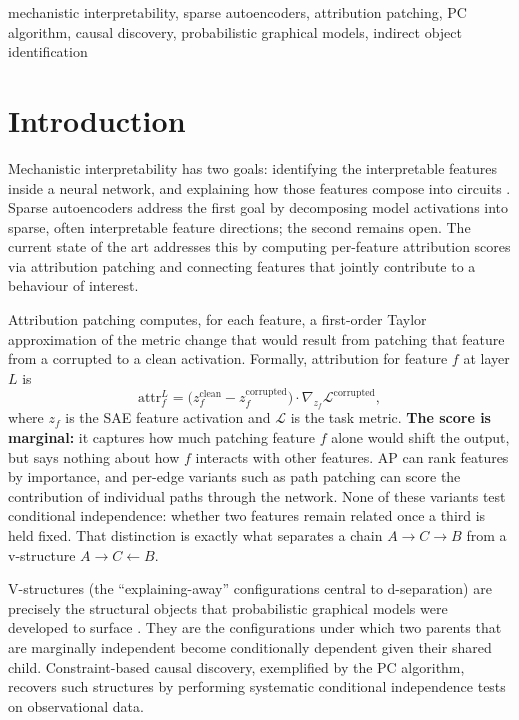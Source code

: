\documentclass[conference]{IEEEtran}
\begin{document}
\begin{IEEEkeywords}
mechanistic interpretability, sparse autoencoders, attribution patching, PC algorithm, causal discovery, probabilistic graphical models, indirect object identification
\end{IEEEkeywords}

\section{Introduction}\label{sec:intro}
Mechanistic interpretability has two goals: identifying the interpretable features inside a neural network, and explaining how those features compose into circuits \cite{marks2025}. Sparse autoencoders \cite{bricken2023, lieberum2024} address the first goal by decomposing model activations into sparse, often interpretable feature directions; the second remains open. The current state of the art \cite{marks2025} addresses this by computing per-feature attribution scores via attribution patching \cite{nanda2022, syed2023} and connecting features that jointly contribute to a behaviour of interest.

Attribution patching computes, for each feature, a first-order Taylor approximation of the metric change that would result from patching that feature from a corrupted to a clean activation. Formally, attribution for feature $f$ at layer $L$ is
\begin{equation}
\text{attr}_f^L = \big(z_f^{\text{clean}} - z_f^{\text{corrupted}}\big) \cdot \nabla_{z_f} \mathcal{L}^{\text{corrupted}},
\label{eq:ap}
\end{equation}
where $z_f$ is the SAE feature activation and $\mathcal{L}$ is the task metric. \textbf{The score is marginal:} it captures how much patching feature $f$ alone would shift the output, but says nothing about how $f$ interacts with other features. AP can rank features by importance, and per-edge variants such as path patching can score the contribution of individual paths through the network. None of these variants test conditional independence: whether two features remain related once a third is held fixed. That distinction is exactly what separates a chain $A \to C \to B$ from a v-structure $A \to C \leftarrow B$.

V-structures (the ``explaining-away'' configurations central to d-separation) are precisely the structural objects that probabilistic graphical models were developed to surface \cite{pearl1988, spirtes1991}. They are the configurations under which two parents that are marginally independent become conditionally dependent given their shared child. Constraint-based causal discovery, exemplified by the PC algorithm, recovers such structures by performing systematic conditional independence tests on observational data.
\end{document}
